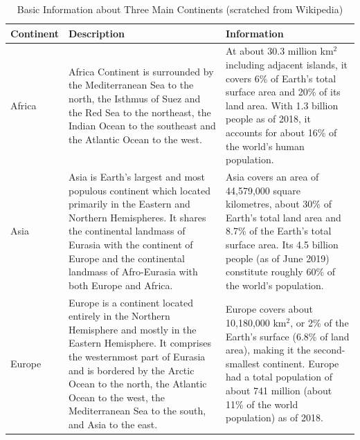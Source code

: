 \documentclass[12pt]{ctexart}
\begin{document}
\begin{longtable}{ p{4em} p{14em} p{14em} }
  \caption{Basic Information about Three Main Continents (scratched from Wikipedia)}
  \label{tb:longtable}                                                                                                                      \\
  \toprule
  Continent                                                  & Description                                                    & Information \\
  \midrule
  Africa                                                     & Africa Continent is surrounded by the Mediterranean Sea to the
  north, the Isthmus of Suez and the Red Sea to the northeast, the Indian
  Ocean to the southeast and the Atlantic Ocean to the west. &
  At about 30.3 million km$^2$ including adjacent islands, it covers 6\%
  of Earth's total surface area and 20\% of its land area. With 1.3
  billion people as of 2018, it accounts for about 16\% of the world's
  human population.                                                                                                                         \\
  \midrule
  Asia                                                       & Asia is Earth's largest and most populous continent which
  located primarily in the Eastern and Northern Hemispheres.
  It shares the continental landmass of Eurasia with the continent
  of Europe and the continental landmass of Afro-Eurasia with both
  Europe and Africa.                                         &
  Asia covers an area of 44,579,000 square kilometres, about 30\%
  of Earth's total land area and 8.7\% of the Earth's total surface
  area. Its 4.5 billion people (as of June 2019) constitute roughly
  60\% of the world's population.                                                                                                           \\
  \midrule
  Europe                                                     & Europe is a continent located entirely in the Northern
  Hemisphere and mostly in the Eastern Hemisphere. It comprises the
  westernmost part of Eurasia and is bordered by the Arctic Ocean to
  the north, the Atlantic Ocean to the west, the Mediterranean Sea to
  the south, and Asia to the east.                           &
  Europe covers about 10,180,000 km$^2$, or 2\% of the Earth's surface
  (6.8\% of land area), making it the second-smallest
  continent. Europe had a total population of about 741 million (about
  11\% of the world population) as of 2018.                                                                                                 \\
  \bottomrule
\end{longtable}
\end{document}
